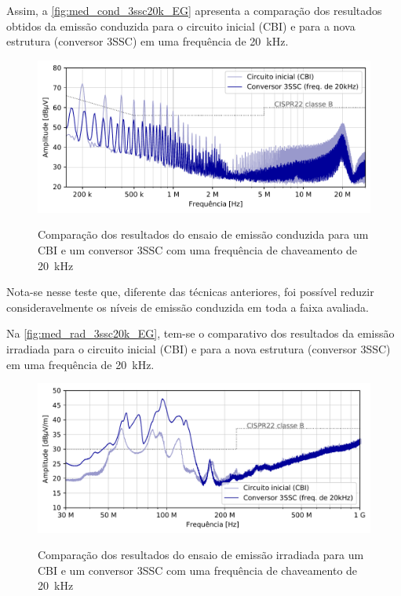     Assim, a \autoref{fig:med_cond_3ssc20k_EG} apresenta a comparação dos resultados obtidos da emissão conduzida para o circuito inicial (CBI) e para a nova estrutura (conversor 3SSC) em uma frequência de \qty{20}{\kilo\hertz}.
    
    \begin{figure}[H]
    	\centering
    	\caption{Comparação dos resultados do ensaio de emissão conduzida para um CBI e um conversor 3SSC com uma frequência de chaveamento de \qty{20}{\kilo\hertz}}
    	\includegraphics[scale=.9]{pdf/cond/Conversor 3SSC (freq. de 20kHz).pdf}
    	\label{fig:med_cond_3ssc20k_EG}
    \end{figure}
    
    Nota-se nesse teste que, diferente das técnicas anteriores, foi possível reduzir consideravelmente os níveis de emissão conduzida em toda a faixa avaliada. 
    
    Na \autoref{fig:med_rad_3ssc20k_EG}, tem-se o comparativo dos resultados da emissão irradiada para o circuito inicial (CBI) e para a nova estrutura (conversor 3SSC) em uma frequência de \qty{20}{\kilo\hertz}.
    
    \begin{figure}[H]
    	\centering
    	\caption{Comparação dos resultados do ensaio de emissão irradiada para um CBI e um conversor 3SSC com uma frequência de chaveamento de \qty{20}{\kilo\hertz}}
    	\includegraphics[scale=.9]{pdf/rad/Conversor 3SSC (freq. de 20kHz).pdf}
    	\label{fig:med_rad_3ssc20k_EG}
    \end{figure}
    

